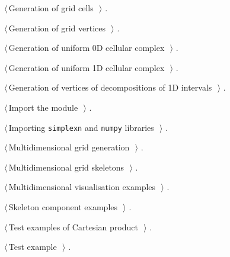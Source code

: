 \documentclass[11pt,oneside]{article}	%
\begin{document}
{\begin{list}{}{\setlength{\itemsep}{-\parsep}\setlength{\itemindent}{-\leftmargin}}
\item $\langle\,$Generation of grid cells\nobreak\ {\footnotesize {}}$\,\rangle$ {\footnotesize {\NWtxtRefIn} .}
\item $\langle\,$Generation of grid vertices\nobreak\ {\footnotesize {}}$\,\rangle$ {\footnotesize {\NWtxtRefIn} .}
\item $\langle\,$Generation of uniform 0D cellular complex\nobreak\ {\footnotesize {}}$\,\rangle$ {\footnotesize {\NWtxtRefIn} .}
\item $\langle\,$Generation of uniform 1D cellular complex\nobreak\ {\footnotesize {}}$\,\rangle$ {\footnotesize {\NWtxtRefIn} .}
\item $\langle\,$Generation of vertices of decompositions of 1D intervals\nobreak\ {\footnotesize {}}$\,\rangle$ {\footnotesize {\NWtxtRefIn} .
}
\item $\langle\,$Import the module\nobreak\ {\footnotesize {}}$\,\rangle$ {\footnotesize {\NWtxtRefIn} .
}
\item $\langle\,$Importing \texttt{simplexn} and \texttt{numpy} libraries\nobreak\ {\footnotesize {}}$\,\rangle$ {\footnotesize {\NWtxtRefIn} .}
\item $\langle\,$Multidimensional grid generation\nobreak\ {\footnotesize {}}$\,\rangle$ {\footnotesize {\NWtxtRefIn} .}
\item $\langle\,$Multidimensional grid skeletons\nobreak\ {\footnotesize {}}$\,\rangle$ {\footnotesize {\NWtxtRefIn} .}
\item $\langle\,$Multidimensional visualisation examples\nobreak\ {\footnotesize {}}$\,\rangle$ {\footnotesize {\NWtxtRefIn} .}
\item $\langle\,$Skeleton component examples\nobreak\ {\footnotesize {}}$\,\rangle$ {\footnotesize {\NWtxtNoRef}.}
\item $\langle\,$Test examples of Cartesian product\nobreak\ {\footnotesize {}}$\,\rangle$ {\footnotesize {\NWtxtRefIn} .}
\item $\langle\,$Test example\nobreak\ {\footnotesize {}}$\,\rangle$ {\footnotesize {\NWtxtNoRef}.}

\end{list}}
\end{document}
